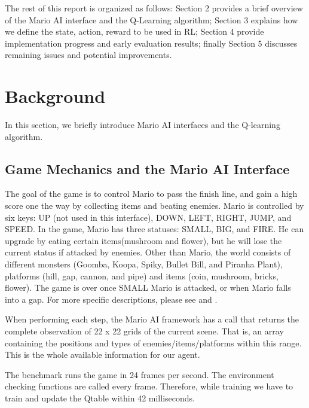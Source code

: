 The rest of this report is organized as follows: Section 2 provides a brief overview of the Mario AI interface and the Q-Learning algorithm; Section 3 explains how we define the state, action, reward to be used in RL; Section 4 provide implementation progress and early evaluation results; finally Section 5 discusses remaining issues and potential improvements.

\section{Background}
In this section, we briefly introduce Mario AI interfaces and the Q-learning algorithm.

\subsection{Game Mechanics and the Mario AI Interface}
The goal of the game is to control Mario to pass the finish line, and gain a high score one the way by collecting items and beating enemies. Mario is controlled by six keys: UP (not used in this interface), DOWN, LEFT, RIGHT, JUMP, and SPEED. In the game, Mario has three statuses: SMALL, BIG, and FIRE. He can upgrade by eating certain items(mushroom and flower), but he will lose the current status if attacked by enemies. Other than Mario, the world consists of different monsters (Goomba, Koopa, Spiky, Bullet Bill, and Piranha Plant), platforms (hill, gap, cannon, and pipe) and items (coin, mushroom, bricks, flower). The game is over once SMALL Mario is attacked, or when Mario falls into a gap. For more specific descriptions, please see \cite{tsay2011evolving} and \cite{togelius20102009}.

When performing each step, the Mario AI framework has a call that returns the complete observation of 22 x 22 grids of the current scene. That is, an array containing the positions and types of enemies/items/platforms within this range. This is the whole available information for our agent.

The benchmark runs the game in 24 frames per second. The environment checking functions are called every frame. Therefore, while training we have to train and update the Qtable within 42 milliseconds.

